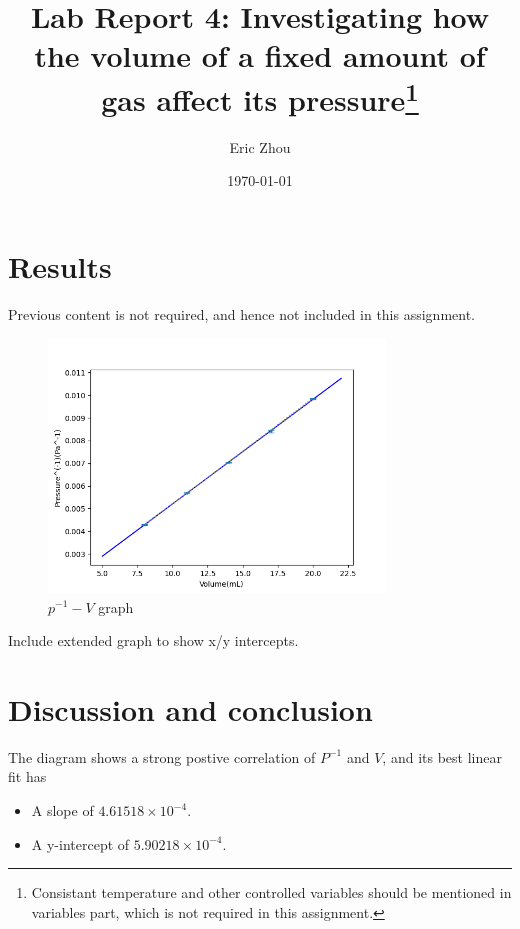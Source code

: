 \documentclass[a4paper]{article}
\begin{document}
\begin{titlepage}
    \title{\textbf{Lab Report 4: Investigating how the volume of a fixed amount of gas affect its pressure\footnote{Consistant temperature and other controlled variables should be mentioned in variables part, which is not required in this assignment.}}}
    \author{Eric Zhou}
    \date{\today}
    \maketitle
\end{titlepage}

\section{Results}

Previous content is not required, and hence not included in this assignment.
\begin{figure}[h!]
    \centering
    \includegraphics[width = 0.8\textwidth]{Figure_1.png}
    \caption{$p^{-1} - V$ graph}
    \label{fig}
\end{figure}

\begin{tcolorbox}[title = Note]
    Include extended graph to show x/y intercepts.
\end{tcolorbox}

\section{Discussion and conclusion}

The diagram shows a strong postive correlation of $P^{-1}$ and $V$, and its best linear fit has

\begin{itemize}
    \item A slope of $4.61518\times 10^{-4}$.
    \item A y-intercept of $5.90218\times 10^{-4}$.
\end{itemize}
\end{document}
